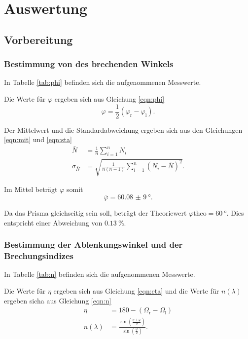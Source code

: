 \section{Auswertung}

\subsection{Vorbereitung}

\subsubsection{Bestimmung von des brechenden Winkels}

In Tabelle \ref{tab:phi} befinden sich die aufgenommenen Messwerte.


Die Werte für $\varphi$ ergeben sich aus Gleichung \eqref{eqn:phi}
\begin{equation}
  \varphi = \frac{1}{2} (\varphi_\text{r} - \varphi_\text{l}).
  \label{eqn:phi}
\end{equation}

Der Mittelwert und die Standardabweichung ergeben sich aus den Gleichungen \ref{eqn:mit} und \eqref{eqn:sta}
\begin{align}
  \bar{N} &= \frac{1}{n} \sum_{i=1}^{n} N_i
  \label{eqn:mit} \\
  \sigma_{\bar{N}} &= \sqrt{\frac{1}{n (n - 1)} \sum_{i=1}^{n} (N_i - \bar{N})^2}.
  \label{eqn:sta}
\end{align}

Im Mittel beträgt $\varphi$ somit
\begin{equation*}
  \bar{\varphi} = \SI{60,08(9)}{°}.
\end{equation*}

Da das Prisma gleichseitig sein soll, beträgt der Theoriewert $\varphi\text{theo} = \SI{60}{°}$. Dies entspricht einer Abweichung von
$\SI{0,13}{\%}$.

\subsubsection{Bestimmung der Ablenkungswinkel und der Brechungsindizes}

In Tabelle \ref{tab:n} befinden sich die aufgenommenen Messwerte.


Die Werte für $\eta$ ergeben sich aus Gleichung \eqref{eqn:eta} und die Werte für $n(\lambda)$ ergeben sicha aus Gleichung \eqref{eqn:n}
\begin{align}
  \eta &= 180 - (\Omega_\text{r} - \Omega_\text{l}) \label{eqn:eta} \\
  n(\lambda) &= \frac{\sin{\left( \frac{\eta + \varphi}{2} \right)}}{\sin{\left( \frac{\varphi}{2} \right)}} \label{eqn:n}.
\end{align}

